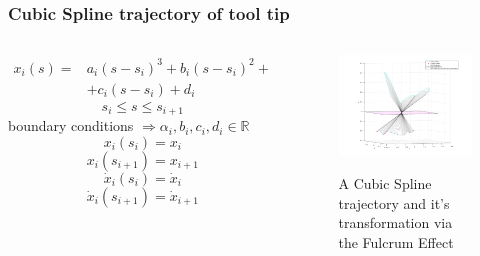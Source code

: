 \begin{frame}
\frametitle{Cubic Spline trajectory of tool tip}

\begin{columns}
\begin{align*}
x_i(s) = & a_i(s-s_i)^3 + b_i(s-s_i)^2 + \\ &+ c_i(s-s_i) + d_i
\end{align*}
\[
s_i \leqslant s \leqslant s_{i+1}
\]
boundary conditions $\Rightarrow α_i,b_i,c_i,d_i \in \mathbb{R}$
\[
x_i(s_i) = x_i
\]
\[
x_i(s_{i+1}) = x_{i+1}
\]
\[
\dot{x}_i(s_i) = \dot{x}_i
\]
\[
\dot{x}_i(s_{i+1}) = \dot{x}_{i+1}
\]

\begin{center}
\begin{figure}[!htb]
\centering
\includegraphics[width=\textwidth]{../images/rcm_trajectories/rcm_cubic_traj.png}\\
\caption{A Cubic Spline trajectory and it's transformation via the Fulcrum Effect}
\end{figure}
\end{center}
\end{columns}
\end{frame}

